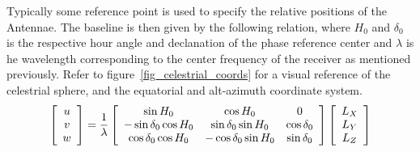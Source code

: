 \documentclass[a4paper,10pt]{report}
\begin{document}
Typically some reference point is used to specify the relative positions of the Antennae. The baseline is then given by the following relation, where $H_0$ and $\delta_0$ is the respective hour angle and declanation of the 
phase reference center and $\lambda$ is he wavelength corresponding to the center frequency of the receiver as mentioned previously. Refer to figure~\ref{fig_celestrial_coords} for a visual reference of the celestrial 
sphere, and the equatorial and alt-azimuth coordinate system.
\begin{equation}
 \left[\begin{array}{c}
     u\\
     v \\
     w \\
    \end{array}\right] = \frac{1}{\lambda}
 \left[\begin{array}{c c c}
     \sin{H_0} 			& \cos{H_0}			& 0 \\
     -\sin{\delta_0}\cos{H_0} 	& \sin{\delta_0}\sin{H_0}	& \cos{\delta_0}\\
     \cos{\delta_0}\cos{H_0} 	& -\cos{\delta_0}\sin{H_0}	& \sin{\delta_0}\\
    \end{array}\right]   
 \left[\begin{array}{c}
     L_X \\
     L_Y \\
     L_Z \\
    \end{array}\right]
\end{equation}
\end{document}
